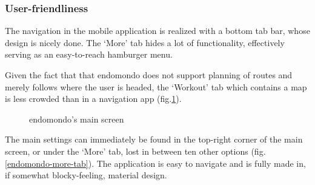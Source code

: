 \subsubsection*{User-friendliness}
The navigation in the mobile application is realized with a bottom tab bar, whose design is nicely done.
The `More' tab hides a lot of functionality, effectively serving as an easy-to-reach hamburger menu.

Given the fact that that endomondo does not support planning of routes and merely follows where the user is headed, the `Workout' tab which contains a map is less crowded than in a navigation app (fig.\ref{endomondo-home-img}).

\begin{figure}[h!]
    \centering
        \caption{endomondo's main screen \cite{endomondo-home-img}}
        \label{endomondo-home-img}
\end{figure}

The main settings can immediately be found in the top-right corner of the main screen, or under the `More' tab, lost in between ten other options (fig.\ref{endomondo-more-tab}).
The application is easy to navigate and is fully made in, if somewhat blocky-feeling, material design.


